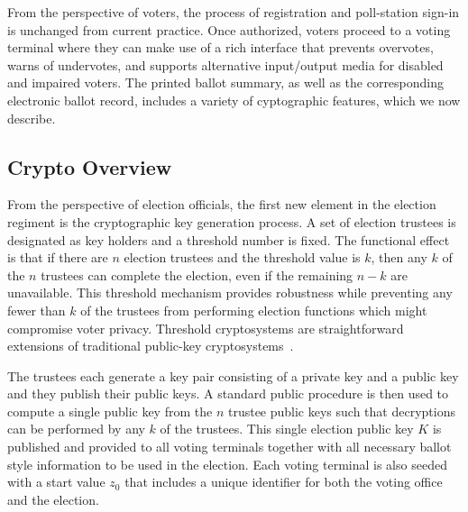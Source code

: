 \label{sec:design}

From the perspective of voters, the process of registration and poll-station sign-in is unchanged from current practice.  Once authorized, voters proceed to a voting terminal where they can make use of a rich interface that prevents overvotes, warns of undervotes, and supports alternative input/output media for disabled and impaired voters. The printed ballot summary, as well as the corresponding electronic ballot record, includes a variety of cyptographic features, which we now describe.




\subsection{Crypto Overview}
From the perspective of election officials, the first new element in the election regiment is the cryptographic key generation process.  A set of election trustees is designated as key holders and a threshold number is fixed.  The functional effect is that if there are $n$ election trustees and the threshold value is $k$, then any $k$ of the $n$ trustees can complete the election, even if the remaining $n-k$ are unavailable.  This threshold mechanism provides robustness while preventing any fewer than $k$ of the trustees from performing election functions which might compromise voter privacy. Threshold cryptosystems are straightforward extensions of traditional public-key cryptosystems~\cite{desmedt90threshold}.

The trustees each generate a key pair consisting of a private key and
a public key and they publish their public keys.  A standard public
procedure is then used to compute a single public key from the $n$
trustee public keys such that decryptions can be performed by any $k$
of the trustees.  This single election public key $K$ is published and
provided to all voting terminals together with all necessary
ballot style information to be used in the election.  Each voting terminal is also seeded with a start value $z_0$ that includes a
unique identifier for both the voting office and the election.

